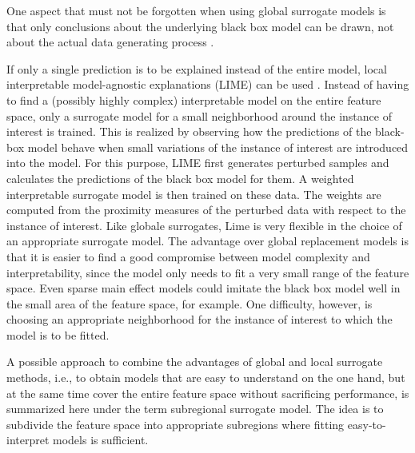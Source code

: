 One aspect that must not be forgotten when using global surrogate models is that only conclusions about the underlying black box model can be drawn, not about the actual data generating process \citep{Molnar.2019}.


If only a single prediction is to be explained instead of the entire model, local interpretable model-agnostic explanations (LIME) can be used \citep{Ribeiro.2016}. Instead of having to find a (possibly highly complex) interpretable model on the entire feature space, only a surrogate model for a small neighborhood around the instance of interest is trained. This is realized by observing how the predictions of the black-box model behave when small variations of the instance of interest are introduced into the model. For this purpose, LIME first generates perturbed samples and calculates the predictions of the black box model for them. A weighted interpretable surrogate model is then trained on these data. The weights are computed from the proximity measures of the perturbed data with respect to the instance of interest. 
Like globale surrogates, Lime is very flexible in the choice of an appropriate surrogate model. The advantage over global replacement models is that it is easier to find a good compromise between model complexity and interpretability, since the model only needs to fit a very small range of the feature space. Even sparse main effect models could imitate the black box model well in the small area of the feature space, for example. One difficulty, however, is choosing an appropriate neighborhood for the instance of interest to which the model is to be fitted.
\citep{Molnar.2019}


A possible approach to combine the advantages of global and local surrogate methods, i.e., to obtain models that are easy to understand on the one hand, but at the same time cover the entire feature space without sacrificing performance, is summarized here under the term subregional surrogate model.
The idea is to subdivide the feature space into appropriate subregions where fitting easy-to-interpret models is sufficient.
\citet{Hall.2017}
